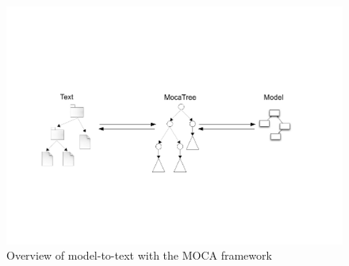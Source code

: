 \begin{figure}[htp]
\begin{center}
 \includegraphics[angle=90, height=\textheight]{pics/moca/text-to-model}
  \caption{Overview of model-to-text with the MOCA framework}
  \label{fig:moca-overview}
\end{center}
\end{figure} 


\clearpage



 
 
%

%

%
 
